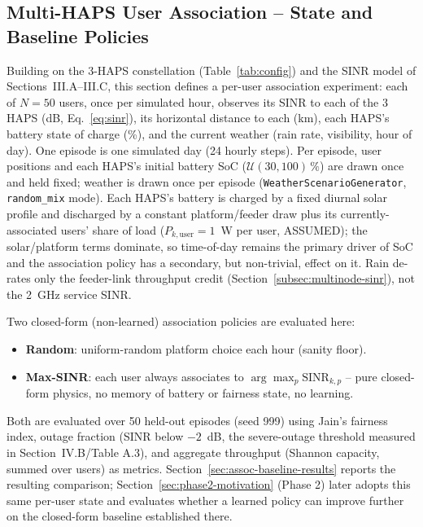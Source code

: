 \documentclass[conference]{IEEEtran}
\begin{document}
\subsection{Multi-HAPS User Association -- State and Baseline Policies}
\label{sec:assoc-baseline-setup}

Building on the 3-HAPS constellation (Table~\ref{tab:config}) and the SINR model of
Sections~III.A--III.C, this section defines a per-user association experiment: each
of $N=50$ users, once per simulated hour, observes its SINR to each of the 3 HAPS
(dB, Eq.~\eqref{eq:sinr}), its horizontal distance to each (km), each HAPS's battery
state of charge (\%), and the current weather (rain rate, visibility, hour of day).
One episode is one simulated day (24 hourly steps). Per episode, user positions and
each HAPS's initial battery SoC ($\mathcal{U}(30,100)\,\%$) are drawn once and held
fixed; weather is drawn once per episode (\texttt{WeatherScenarioGenerator},
\texttt{random\_mix} mode). Each HAPS's battery is charged by a fixed diurnal solar
profile and discharged by a constant platform/feeder draw plus its currently-associated
users' share of load ($P_{k,\text{user}}=1$~W per user, ASSUMED); the solar/platform
terms dominate, so time-of-day remains the primary driver of SoC and the association
policy has a secondary, but non-trivial, effect on it. Rain de-rates only the
feeder-link throughput credit (Section~\ref{subsec:multinode-sinr}), not the 2~GHz
service SINR.

Two closed-form (non-learned) association policies are evaluated here:
\begin{itemize}\setlength{\itemsep}{0pt}
  \item \textbf{Random}: uniform-random platform choice each hour (sanity floor).
  \item \textbf{Max-SINR}: each user always associates to $\arg\max_p \text{SINR}_{k,p}$
    -- pure closed-form physics, no memory of battery or fairness state, no learning.
\end{itemize}
Both are evaluated over 50 held-out episodes (seed 999) using Jain's fairness index,
outage fraction (SINR below $-2$~dB, the severe-outage threshold measured in
Section~IV.B/Table A.3), and aggregate throughput (Shannon capacity, summed over
users) as metrics. Section~\ref{sec:assoc-baseline-results} reports the resulting
comparison; Section~\ref{sec:phase2-motivation} (Phase 2) later adopts this same
per-user state and evaluates whether a learned policy can improve further on the
closed-form baseline established there.
\end{document}
